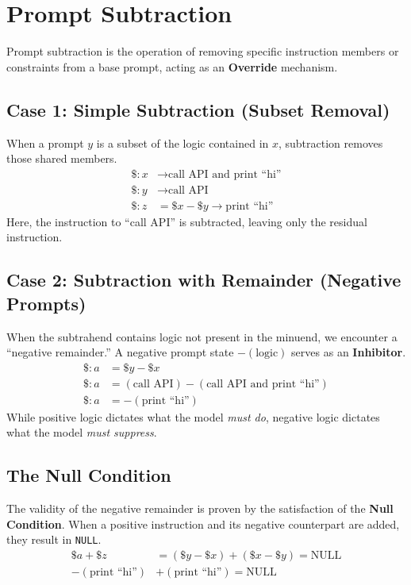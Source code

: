 \documentclass[11pt, a4paper]{article}
\begin{document}
\section{Prompt Subtraction}
Prompt subtraction is the operation of removing specific instruction members or constraints from a base prompt, acting as an \textbf{Override} mechanism.

\subsection{Case 1: Simple Subtraction (Subset Removal)}
When a prompt $y$ is a subset of the logic contained in $x$, subtraction removes those shared members.
\begin{align*}
    \$: x &\rightarrow \text{call API and print ``hi''} \\
    \$: y &\rightarrow \text{call API} \\
    \$: z &= \$x - \$y \rightarrow \text{print ``hi''}
\end{align*}
Here, the instruction to ``call API'' is subtracted, leaving only the residual instruction.

\subsection{Case 2: Subtraction with Remainder (Negative Prompts)}
When the subtrahend contains logic not present in the minuend, we encounter a ``negative remainder.'' A negative prompt state $-(\text{logic})$ serves as an \textbf{Inhibitor}.
\begin{align*}
    \$: a &= \$y - \$x \\
    \$: a &= (\text{call API}) - (\text{call API and print ``hi''}) \\
    \$: a &= -(\text{print ``hi''})
\end{align*}
While positive logic dictates what the model \textit{must do}, negative logic dictates what the model \textit{must suppress}.

\subsection{The Null Condition}
The validity of the negative remainder is proven by the satisfaction of the \textbf{Null Condition}. When a positive instruction and its negative counterpart are added, they result in \texttt{NULL}.
\begin{align*}
    \$a + \$z &= (\$y - \$x) + (\$x - \$y) = \text{NULL} \\
    -(\text{print ``hi''}) &+ (\text{print ``hi''}) = \text{NULL}
\end{align*}
\end{document}
